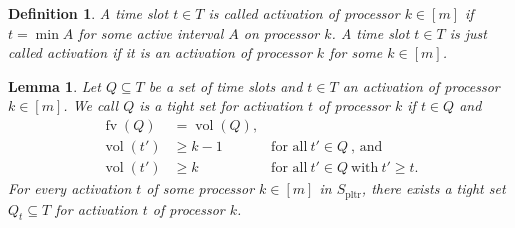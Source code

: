 \documentclass[a4paper]{article}
\DeclareMathOperator{\pltr}{pltr}
\DeclareMathOperator{\fv}{fv}
\DeclareMathOperator{\vol}{vol}
\newtheorem{lemma}[theorem]{Lemma}
\newtheorem{definition}[theorem]{Definition}
\begin{document}
\begin{definition}
  A time slot $t \in T$ is called \emph{activation of processor $k \in [m]$} if $t = \min A$ for some active interval $A$ on processor $k$.
  A time slot $t \in T$ is just called \emph{activation} if it is an activation of processor $k$ for some $k \in [m]$.
\end{definition}
\begin{lemma}\label{lemma:critical}
  Let $Q \subseteq T$ be a set of time slots and $t \in T$ an activation of processor $k \in [m]$.
  We call $Q$ is a \emph{tight set for activation $t$ of processor $k$} if $t \in Q$ and
  \begin{align}
    \fv(Q) &= \vol(Q) \text{,}\\
    \vol(t') &\geq k-1 &~\text{for all}~t' \in Q~\text{, and}\\
    \vol(t') &\geq k &~\text{for all}~t' \in Q~\text{with}~t' \geq t \text{.}
  \end{align}
  For every activation $t$ of some processor $k \in [m]$ in $S_{\pltr}$, there exists a tight set $Q_t \subseteq T$ for activation $t$ of processor $k$.
\end{lemma}
\end{document}

